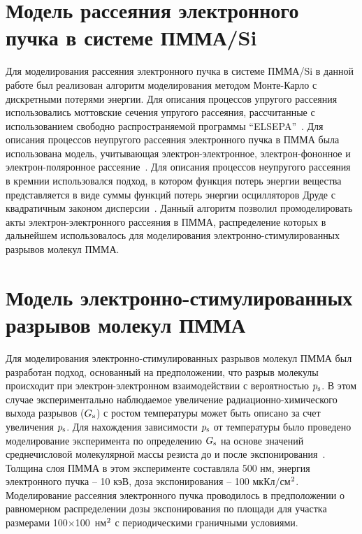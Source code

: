 \section{Модель рассеяния электронного пучка в системе ПММА/Si}

Для моделирования рассеяния электронного пучка в системе ПММА/Si в данной работе был реализован алгоритм моделирования методом Монте-Карло с дискретными потерями энергии. Для описания процессов упругого рассеяния использовались моттовские сечения упругого рассеяния, рассчитанные с использованием свободно распространяемой программы ``ELSEPA''~\cite{ELSEPA}. Для описания процессов неупругого рассеяния электронного пучка в ПММА была использована модель, учитывающая электрон-электронное, электрон-фононное и электрон-поляронное рассеяние~\cite{Ciappa_2010}. Для описания процессов неупругого рассеяния в кремнии использовался подход, в котором функция потерь энергии вещества представляется в виде суммы функций потерь энергии осцилляторов Друде с квадратичным законом дисперсии~\cite{Valentin2012_Si}. Данный алгоритм позволил промоделировать акты электрон-электронного рассеяния в \linebreak ПММА, распределение которых в дальнейшем использовалось для моделирования электронно-стимулированных разрывов молекул ПММА.

\section{Модель электронно-стимулированных разрывов молекул ПММА}
Для моделирования электронно-стимулированных разрывов молекул \linebreak ПММА был разработан подход, основанный на предположении, что разрыв молекулы происходит при электрон-электронном взаимодействии с вероятностью $p_\mathrm{s}$. В этом случае экспериментально наблюдаемое увеличение радиационно-химического выхода разрывов ($G_\mathrm{s}$) с ростом температуры может быть описано за счет увеличения $p_\mathrm{s}$. Для нахождения зависимости $p_\mathrm{s}$ от температуры было проведено моделирование эксперимента по определению $G_\mathrm{s}$ на основе значений среднечисловой молекулярной массы резиста до и после экспонирования~\cite{Harris_G_value}. Толщина слоя ПММА в этом эксперименте составляла 500 нм, энергия электронного пучка -- 10 кэВ, доза экспонирования -- 100 мкКл/см$^\text{2}$. Моделирование рассеяния электронного пучка проводилось в предположении о равномерном распределении дозы экспонирования по площади для участка размерами 100$\times$100~нм$^\text{2}$ с периодическими граничными условиями.

